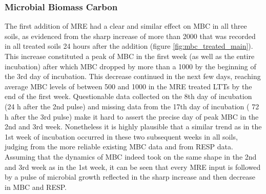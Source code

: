 		\subsubsection{Microbial Biomass Carbon}
			The first addition of MRE had a clear and similar effect on MBC in all three soils, as evidenced from the sharp increase of more than 2000 \genericunit that was recorded in all treated soils 24 hours after the addition (figure \ref{fig:mbc_treated_main}). This increase constituted a peak of MBC in the first ­week (as well as the entire incubation) after which MBC dropped by more than a 1000 \genericunit by the beginning of the 3rd day of incubation. This decrease continued in the next few days, reaching average MBC levels of between 500 and 1000 \genericunit in the MRE treated LTTs by the end of the first week. Questionable data collected on the 8th day of incubation (24 h after the 2nd pulse) and missing data from the 17th day of incubation ( 72 h after the 3rd pulse)  make it hard to assert the precise day of peak MBC in the 2nd and 3rd  week. Nonetheless it is highly plausible that a similar trend as in the 1st week of incubation occurred in these two subsequent weeks in all soils, judging from  the more reliable existing MBC data and from RESP data. Assuming that the dynamics of MBC indeed took on the same shape in the 2nd and 3rd week as in the 1st week, it can be seen that every MRE input is followed by a pulse of microbial growth reflected in the sharp increase and then decrease in MBC and RESP.\\



